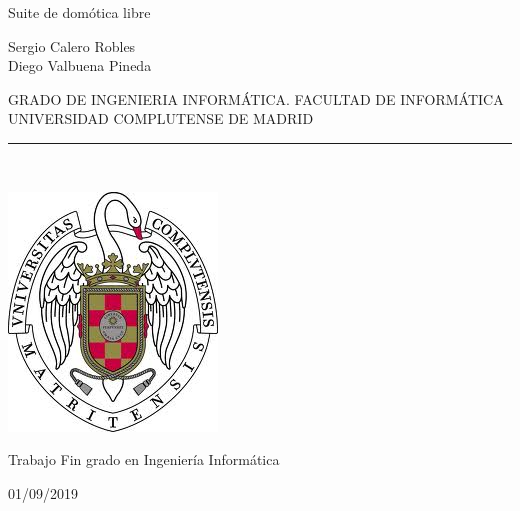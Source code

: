 \begin{center}

   \vspace{1cm}


   {\Large Suite de domótica libre}\\

   \vspace{1cm}

   {\large
    Sergio Calero Robles\\
    Diego Valbuena Pineda\\
    }

   \vspace{0.5cm}




   GRADO DE INGENIERIA INFORMÁTICA. FACULTAD DE INFORMÁTICA\\
   UNIVERSIDAD COMPLUTENSE DE MADRID \\


   \vspace{0.65cm}
   \rule{2in}{0.5pt}\\
   \vspace{0.85cm}

  \includegraphics[height=2.5in]{figures/escudo.jpg}


   \vspace{0.5cm}
    Trabajo Fin grado en Ingeniería Informática

   \vspace{0.5cm}






  01/09/2019\\
   \vspace{1cm}

\end{center}

